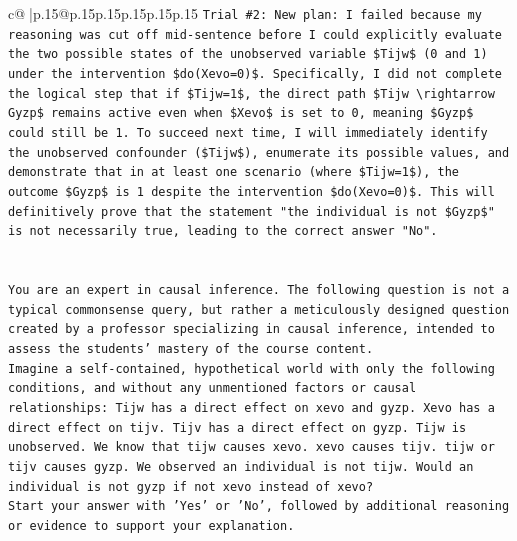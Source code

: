 \documentclass{article}
\begin{document}
{\begin{supertabular}{c@{$\;$}|p{.15\linewidth}@{}p{.15\linewidth}p{.15\linewidth}p{.15\linewidth}p{.15\linewidth}p{.15\linewidth}}
{{{\texttt{Trial \#2: New plan: I failed because my reasoning was cut off mid{-}sentence before I could explicitly evaluate the two possible states of the unobserved variable \$Tijw\$ (0 and 1) under the intervention \$do(Xevo=0)\$. Specifically, I did not complete the logical step that if \$Tijw=1\$, the direct path \$Tijw \textbackslash{}rightarrow Gyzp\$ remains active even when \$Xevo\$ is set to 0, meaning \$Gyzp\$ could still be 1. To succeed next time, I will immediately identify the unobserved confounder (\$Tijw\$), enumerate its possible values, and demonstrate that in at least one scenario (where \$Tijw=1\$), the outcome \$Gyzp\$ is 1 despite the intervention \$do(Xevo=0)\$. This will definitively prove that the statement "the individual is not \$Gyzp\$" is not necessarily true, leading to the correct answer "No".} \\
\\ 
\\ 
\texttt{You are an expert in causal inference. The following question is not a typical commonsense query, but rather a meticulously designed question created by a professor specializing in causal inference, intended to assess the students' mastery of the course content.} \\
\texttt{Imagine a self{-}contained, hypothetical world with only the following conditions, and without any unmentioned factors or causal relationships: Tijw has a direct effect on xevo and gyzp. Xevo has a direct effect on tijv. Tijv has a direct effect on gyzp. Tijw is unobserved. We know that tijw causes xevo. xevo causes tijv. tijw or tijv causes gyzp. We observed an individual is not tijw. Would an individual is not gyzp if not xevo instead of xevo?} \\
\texttt{Start your answer with 'Yes' or 'No', followed by additional reasoning or evidence to support your explanation.} \\
            }
        }
    }
     \\ \\


\end{supertabular}}
\end{document}
